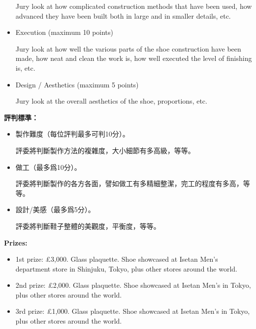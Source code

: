 \begin{paracol}{2}
\begin{itemize}
            Jury look at how complicated construction methods that have been used, how advanced they have been built both in large and in smaller details, etc.

            \item Execution (maximum 10 points)

            Jury look at how well the various parts of the shoe construction have been made, how neat and clean the work is, how well executed the level of finishing is, etc.

            \item Design / Aesthetics (maximum 5 points)

            Jury look at the overall aesthetics of the shoe, proportions, etc.
        \end{itemize}

        \switchcolumn
        \textbf{評判標準：}
        \begin{itemize}
            \item 製作難度（每位評判最多可判10分）。

            評委將判斷製作方法的複雜度，大小細節有多高級，等等。

            \item 做工（最多爲10分）。

            評委將判斷製作的各方各面，譬如做工有多精細整潔，完工的程度有多高，等等。

            \item 設計/美感（最多爲5分）。

            評委將判斷鞋子整體的美觀度，平衡度，等等。
        \end{itemize}
        \switchcolumn*

        \textbf{Prizes:}
        \begin{itemize}
            \item 1st prize: £3,000. Glass plaquette. Shoe showcased at Isetan Men’s department store in Shinjuku, Tokyo, plus other stores around the world.
            \item 2nd prize: £2,000. Glass plaquette. Shoe showcased at Isetan Men’s in Tokyo, plus other stores around the world.
            \item 3rd prize: £1,000. Glass plaquette. Shoe showcased at Isetan Men’s in Tokyo, plus other stores around the world.
        \end{itemize}

        \vspace{1em}


\end{paracol}
